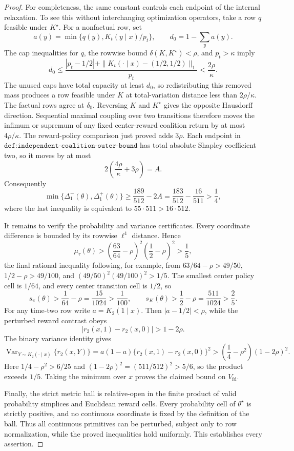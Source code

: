 \documentclass{article}
\begin{document}
\begin{proof}
For completeness, the same constant controls each endpoint of the internal relaxation.  To see this without interchanging optimization operators, take a row \(q\) feasible under \(K^\star\).  For a nonfactual row, set
\[
 a(y)=\min\{q(y),K_t(y\mid x)/p_t\},
 \qquad d_0=1-\sum_y a(y).
\]
The cap inequalities for \(q\), the rowwise bound \(\delta(K,K^\star)<\rho\), and \(p_t>\kappa\) imply
\[
 d_0
 \le \frac{|p_t-1/2|+
 \|K_t(\cdot\mid x)-(1/2,1/2)\|_1}{p_t}
 <\frac{2\rho}{\kappa}.
\]
The unused caps have total capacity at least \(d_0\), so redistributing this removed mass produces a row feasible under \(K\) at total-variation distance less than \(2\rho/\kappa\).  The factual rows agree at \(\delta_0\).  Reversing \(K\) and \(K^\star\) gives the opposite Hausdorff direction.  Sequential maximal coupling over two transitions therefore moves the infimum or supremum of any fixed center-reward coalition return by at most \(4\rho/\kappa\).  The reward-policy comparison just proved adds \(3\rho\).  Each endpoint in \(\texttt{def:independent-coalition-outer-bound}\) has total absolute Shapley coefficient two, so it moves by at most
\[
 2\left(\frac{4\rho}{\kappa}+3\rho\right)=A.
\]
Consequently
\[
 \min\{\Delta_1^-(\theta),\Delta_1^+(\theta)\}
 \ge \frac{189}{512}-2A
 =\frac{183}{512}-\frac{16}{511}
 >\frac14,
\]
where the last inequality is equivalent to \(55\cdot511>16\cdot512\).

It remains to verify the probability and variance certificates.  Every coordinate difference is bounded by its rowwise \(\ell^1\) distance.  Hence
\[
 \mu_\tau(\theta)
 >\left(\frac{63}{64}-\rho\right)^2
   \left(\frac12-\rho\right)^2>\frac15,
\]
the final rational inequality following, for example, from \(63/64-\rho>49/50\), \(1/2-\rho>49/100\), and \((49/50)^2(49/100)^2>1/5\).  The smallest center policy cell is \(1/64\), and every center transition cell is \(1/2\), so
\[
 s_\pi(\theta)>\frac1{64}-\rho=\frac{15}{1024}>\frac1{100},
 \qquad
 s_K(\theta)>\frac12-\rho=\frac{511}{1024}>\frac25.
\]
For any time-two row write \(a=K_2(1\mid x)\).  Then \(|a-1/2|<\rho\), while the perturbed reward contrast obeys
\[
 |r_2(x,1)-r_2(x,0)|>1-2\rho.
\]
The binary variance identity gives
\[
 \operatorname{Var}_{Y\sim K_2(\cdot\mid x)}\{r_2(x,Y)\}
 =a(1-a)\{r_2(x,1)-r_2(x,0)\}^2
 >\left(\frac14-\rho^2\right)(1-2\rho)^2.
\]
Here \(1/4-\rho^2>6/25\) and \((1-2\rho)^2=(511/512)^2>5/6\), so the product exceeds \(1/5\).  Taking the minimum over \(x\) proves the claimed bound on \(V_{\mathrm{fd}}\).

Finally, the strict metric ball is relative-open in the finite product of valid probability simplices and Euclidean reward cells.  Every probability cell of \(\theta^\star\) is strictly positive, and no continuous coordinate is fixed by the definition of the ball.  Thus all continuous primitives can be perturbed, subject only to row normalization, while the proved inequalities hold uniformly.  This establishes every assertion.
\end{proof}
\end{document}
